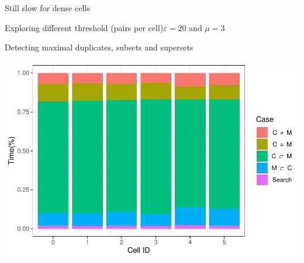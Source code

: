 \documentclass{beamer}
\begin{document}
\begin{frame}{Still slow for dense cells}
\begin{frame}{Exploring different threshold (pairs per cell)}{$\varepsilon=20$ and $\mu=3$}
\begin{frame}{Detecting maximal duplicates, subsets and supersets}
\begin{minipage}{0.49\textwidth}
                \includegraphics[width=\textwidth]{figures/Maximals/performanceBySum2}
        \end{minipage}
\end{frame}


\end{frame}
\end{frame}
\end{document}
